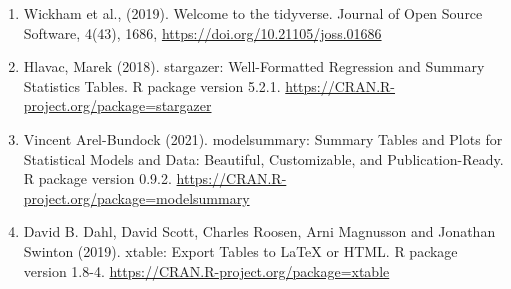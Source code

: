 \documentclass[
]{article}
\begin{document}
\begin{enumerate}
\def\labelenumi{\arabic{enumi}.}
\item
  Wickham et al., (2019). Welcome to the tidyverse. Journal of Open
  Source Software, 4(43), 1686,
  \url{https://doi.org/10.21105/joss.01686}
\item
  Hlavac, Marek (2018). stargazer: Well-Formatted Regression and Summary
  Statistics Tables. R package version 5.2.1.
  \url{https://CRAN.R-project.org/package=stargazer}
\item
  Vincent Arel-Bundock (2021). modelsummary: Summary Tables and Plots
  for Statistical Models and Data: Beautiful, Customizable, and
  Publication-Ready. R package version 0.9.2.
  \url{https://CRAN.R-project.org/package=modelsummary}
\item
  David B. Dahl, David Scott, Charles Roosen, Arni Magnusson and
  Jonathan Swinton (2019). xtable: Export Tables to LaTeX or HTML. R
  package version 1.8-4. \url{https://CRAN.R-project.org/package=xtable}
\end{enumerate}
\end{document}
